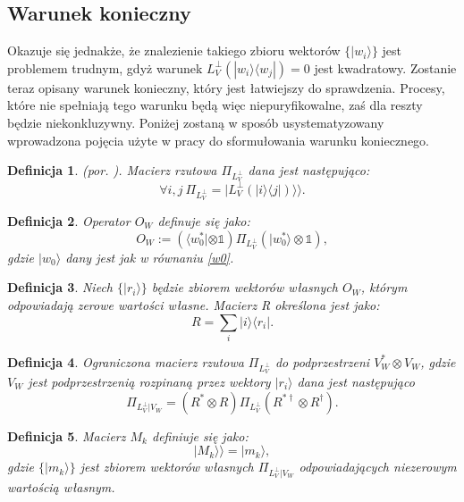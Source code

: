 \documentclass[10pt]{article} %
\newtheorem{definicja}{Definicja}
\newcommand{\Ket}[1]{|#1\rangle}
\newcommand{\Bra}[1]{\langle#1|}
\newcommand{\KKet}[1]{|#1\rangle\rangle}
\newcommand{\I}{\mathbb{1}}
\newcommand{\LPV}{{L^\perp_V}}
\begin{document}
\subsection{Warunek konieczny}
Okazuje się jednakże, że znalezienie takiego zbioru wektorów $\{ \Ket{w_i} \}$ jest problemem trudnym, gdyż warunek $L^\perp_V(\Ket{w_i}\Bra{w_j})=0$ jest kwadratowy. 
Zostanie teraz opisany warunek konieczny, który jest łatwiejszy do sprawdzenia. Procesy, które nie spełniają tego warunku będą więc niepuryfikowalne, zaś dla reszty będzie niekonkluzywny. Poniżej zostaną w sposób usystematyzowany wprowadzona pojęcia użyte w pracy \cite{purification} do sformułowania 
warunku koniecznego.
\begin{definicja}
(por. \cite{purification}).
Macierz rzutowa $\Pi_\LPV$ dana jest następująco:
\begin{equation}
\forall i,j ~\Pi_\LPV = \KKet{\LPV(\Ket{i}\Bra{j})}.
\end{equation}
\end{definicja}
\begin{definicja}
Operator $O_W$ definuje się jako:
\begin{equation}
O_W:= \left(\Bra{w^*_0} \otimes \I\right) \Pi_\LPV \left( \Ket{w^*_0} \otimes \I\right),
\end{equation}
gdzie $\Ket{w_0}$ dany jest jak w równaniu \eqref{w0}.
\end{definicja}
\begin{definicja}
Niech $\{\Ket{r_i}\}$ będzie zbiorem wektorów własnych $O_W$, którym odpowiadają zerowe wartości własne. Macierz R określona jest jako:
\begin{equation}
R = \sum_i \Ket{i}\Bra{r_i}.
\end{equation}
\end{definicja}
\begin{definicja}
Ograniczona macierz rzutowa $\Pi_\LPV$ do podprzestrzeni $V_W^* \otimes V_W$, gdzie $V_W$ jest podprzestrzenią rozpinaną przez wektory $\Ket{r_i}$ dana jest następująco
\begin{equation}
\Pi_{\LPV|V_W} = (R^* \otimes R) \Pi_\LPV (R^{*\dag} \otimes R^\dag).
\end{equation}
\end{definicja}
\begin{definicja}
Macierz $M_k$ definiuje się jako:
\begin{equation}
\KKet{M_k} = \Ket{m_k},
\end{equation} gdzie $\{ \Ket{m_k} \}$ jest zbiorem wektorów własnych $\Pi_{\LPV|V_W}$ odpowiadających niezerowym wartością własnym.
\end{definicja}
\end{document}

